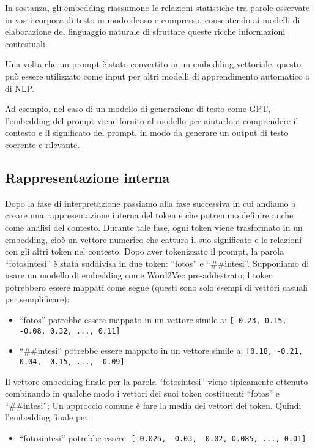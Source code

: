             In sostanza, gli embedding riassumono le relazioni statistiche tra parole osservate in vasti corpora di testo in modo denso e compresso, consentendo ai modelli di elaborazione del linguaggio naturale di sfruttare queste ricche informazioni contestuali.
            
            Una volta che un prompt è stato convertito in un embedding vettoriale, questo può essere utilizzato come input per altri modelli di apprendimento automatico o di NLP.
            
            Ad esempio, nel caso di un modello di generazione di testo come GPT, l'embedding del prompt viene fornito al modello per aiutarlo a comprendere il contesto e il significato del prompt, in modo da generare un output di testo coerente e rilevante.
            
    \subsection{Rappresentazione interna}
        Dopo la fase di interpretazione passiamo alla fase successiva in cui andiamo a creare una rappresentazione interna del token e che potremmo definire anche come analisi del contesto. Durante tale fase, ogni token viene trasformato in un embedding, cioè un vettore numerico che cattura il suo significato e le relazioni con gli altri token nel contesto. Dopo aver tokenizzato il prompt, la parola ``fotosintesi'' è stata suddivisa in due token: ``fotos'' e ``\#\#intesi''. Supponiamo di usare un modello di embedding come Word2Vec pre-addestrato; l token potrebbero essere mappati come segue (questi sono solo esempi di vettori casuali per semplificare):
        \begin{itemize}
            \item ``fotos'' potrebbe essere mappato in un vettore simile a: \texttt{[-0.23, 0.15, -0.08, 0.32, ..., 0.11]}
            \item ``\#\#intesi'' potrebbe essere mappato in un vettore simile a: \texttt{[0.18, -0.21, 0.04, -0.15, ..., -0.09]}
        \end{itemize}
        
        Il vettore embedding finale per la parola ``fotosintesi'' viene tipicamente ottenuto combinando in qualche modo i vettori dei suoi token costituenti ``fotos'' e ``\#\#intesi''; Un approccio comune è fare la media dei vettori dei token. Quindi l'embedding finale per:
        \begin{itemize}
            \item ``fotosintesi'' potrebbe essere: \texttt{[-0.025, -0.03, -0.02, 0.085, ..., 0.01]}
        \end{itemize}
        
